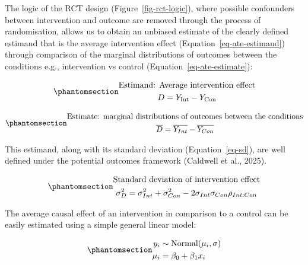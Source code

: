 \documentclass[
]{article}
\begin{document}
The logic of the RCT design (Figure~\ref{fig-rct-logic}), where possible
confounders between intervention and outcome are removed through the
process of randomisation, allows us to obtain an unbiased estimate of
the clearly defined estimand that is the average intervention effect
(Equation~\ref{eq-ate-estimand}) through comparison of the marginal
distributions of outcomes between the conditions e.g., intervention vs
control (Equation~\ref{eq-ate-estimate}):

\begin{equation}\protect\phantomsection\label{eq-ate-estimand}{
\begin{gathered}
\text{Estimand: Average intervention effect} \\
D = Y_{\mathrm{Int}} - Y_{\mathrm{Con}}
\end{gathered}
}\end{equation}

\begin{equation}\protect\phantomsection\label{eq-ate-estimate}{
\begin{gathered}
\text{Estimate: marginal distributions of outcomes between the conditions} \\
\overline{D}=\overline{Y_{Int}}-\overline{Y_{Con}} 
\end{gathered}
}\end{equation}

This estimand, along with its standard deviation (Equation~\ref{eq-sd}),
are well defined under the potential outcomes framework (Caldwell et
al., 2025).

\begin{equation}\protect\phantomsection\label{eq-sd}{
\begin{gathered}
\text{Standard deviation of intervention effect} \\
\sigma_{D}^2=\sigma_{Int}^2+\sigma_{Con}^2-2\sigma_{Int}\sigma_{Con}\rho_{Int:Con} 
\end{gathered}
}\end{equation}

The average causal effect of an intervention in comparison to a control
can be easily estimated using a simple general linear model:

\begin{equation}\protect\phantomsection\label{eq-glm}{
\begin{aligned}
y_i &\sim \text{Normal}(\mu_i, \sigma) \\
\mu_i &= \beta_0 + \beta_1 x_i
\end{aligned}
}\end{equation}
\end{document}
